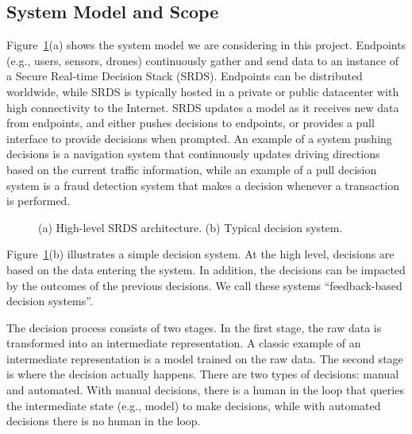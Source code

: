 \subsection{System Model and Scope}


Figure~\ref{figure:model-and-decision}(a) shows the system model we are considering in this project. Endpoints (e.g., users, sensors, drones)  continuously gather and send data to an instance of a Secure Real-time Decision Stack (SRDS). Endpoints can be distributed worldwide, while SRDS is typically hosted in a private or public datacenter with high connectivity to the Internet. SRDS updates a model as it receives new data from endpoints, and either pushes decisions to endpoints, or provides a pull interface to provide decisions when prompted. An example of a system pushing decisions is a navigation system that continuously updates driving directions based on the current traffic information, while an example of a pull decision system  is a fraud detection system that makes a decision whenever a transaction is performed.

\0
\begin{figure}[h]
 \caption{\small{(a) High-level SRDS architecture. (b) Typical decision system.}}
  \label{figure:model-and-decision}
\end{figure}

Figure~\ref{figure:model-and-decision}(b) illustrates a simple decision system. At the high level, decisions are based on the data entering the system. In addition, the decisions can be impacted by the outcomes of the previous decisions. We call these systems ``feedback-based decision systems''.

The decision process consists of two stages. In the first stage, the raw data is transformed into an intermediate representation. A classic example of an intermediate representation is a model trained on the raw data. The second stage is where the decision actually happens. There are two types of decisions: manual and automated. With manual decisions, there is a human in the loop that queries the intermediate state (e.g., model) to make decisions, while with automated decisions there is no human in the loop.

